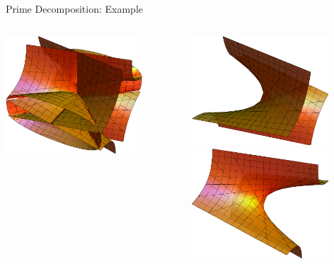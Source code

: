 \documentclass[notes=hide]{beamer}
\begin{document}
\begin{frame}{Prime Decomposition: Example}
\begin{columns}[onlytextwidth]
	\begin{column}{0.6\textwidth}
	\includegraphics[width=0.8\textwidth]{complvar}
	\end{column}
	\begin{column}{0.4\textwidth}
	\includegraphics[width=0.8\textwidth]{complvar11}\\
\includegraphics[width=0.8\textwidth]{complvar12}\\

\end{column}
\end{columns}
\end{frame}
\end{document}
